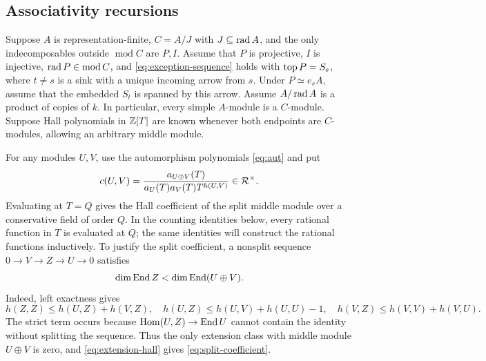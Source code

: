 \subsection{Associativity recursions}
Suppose $A$ is representation-finite, $C=A/J$ with $J\subseteq\operatorname{rad} A$, and the only indecomposables outside $\operatorname{mod}C$ are $P,I$. Assume that $P$ is projective, $I$ is injective, $\operatorname{rad} P\in\operatorname{mod}C$, and \eqref{eq:exception-sequence} holds with $\operatorname{top} P=S_s$, where $t\ne s$ is a sink with a unique incoming arrow from $s$. Under $P\simeq e_sA$, assume that the embedded $S_t$ is spanned by this arrow. Assume $A/\operatorname{rad} A$ is a product of copies of $k$. In particular, every simple $A$-module is a $C$-module. Suppose Hall polynomials in $\mathbb Z[T]$ are known whenever both endpoints are $C$-modules, allowing an arbitrary middle module.

For any modules $U,V$, use the automorphism polynomials \eqref{eq:aut} and put
\begin{equation}\label{eq:split-coefficient}
 c(U,V)=\frac{a_{U\oplus V}(T)}{a_U(T)a_V(T)T^{h(U,V)}}\in\mathcal R^\times.
\end{equation}
Evaluating at $T=Q$ gives the Hall coefficient of the split middle module over a conservative field of order $Q$. In the counting identities below, every rational function in $T$ is evaluated at $Q$; the same identities will construct the rational functions inductively. To justify the split coefficient, a nonsplit sequence $0\to V\to Z\to U\to0$ satisfies
\begin{equation}\label{eq:end-strict}
 \dim\operatorname{End} Z<\dim\operatorname{End}(U\oplus V).
\end{equation}
Indeed, left exactness gives
\[
 h(Z,Z)\le h(U,Z)+h(V,Z),\quad
 h(U,Z)\le h(U,V)+h(U,U)-1,\quad
 h(V,Z)\le h(V,V)+h(V,U).
\]
The strict term occurs because $\operatorname{Hom}(U,Z)\to\operatorname{End} U$ cannot contain the identity without splitting the sequence. Thus the only extension class with middle module $U\oplus V$ is zero, and \eqref{eq:extension-hall} gives \eqref{eq:split-coefficient}.


